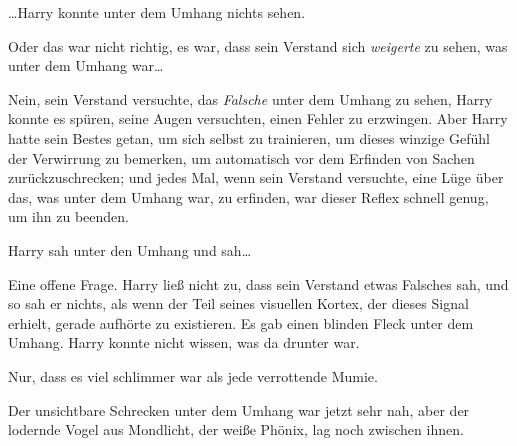 …Harry konnte unter dem Umhang nichts sehen.

Oder das war nicht richtig, es war, dass sein Verstand sich \emph{weigerte} zu sehen, was unter dem Umhang war…

Nein, sein Verstand versuchte, das \emph{Falsche} unter dem Umhang zu sehen, Harry konnte es spüren, seine Augen versuchten, einen Fehler zu erzwingen. Aber Harry hatte sein Bestes getan, um sich selbst zu trainieren, um dieses winzige Gefühl der Verwirrung zu bemerken, um automatisch vor dem Erfinden von Sachen zurückzuschrecken; und jedes Mal, wenn sein Verstand versuchte, eine Lüge über das, was unter dem Umhang war, zu erfinden, war dieser Reflex schnell genug, um ihn zu beenden.

Harry sah unter den Umhang und sah…

Eine offene Frage. Harry ließ nicht zu, dass sein Verstand etwas Falsches sah, und so sah er nichts, als wenn der Teil seines visuellen Kortex, der dieses Signal erhielt, gerade aufhörte zu existieren. Es gab einen blinden Fleck unter dem Umhang. Harry konnte nicht wissen, was da drunter war.

Nur, dass es viel schlimmer war als jede verrottende Mumie.

Der unsichtbare Schrecken unter dem Umhang war jetzt sehr nah, aber der lodernde Vogel aus Mondlicht, der weiße Phönix, lag noch zwischen ihnen.

